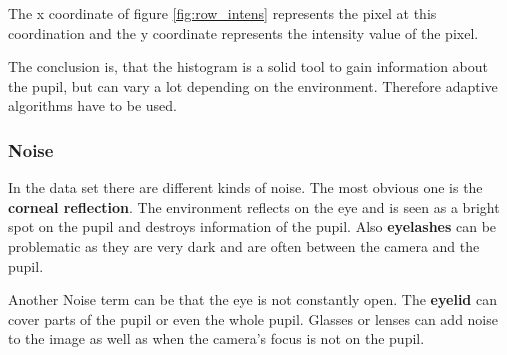     The x coordinate of figure \ref{fig:row_intens} represents the pixel at this coordination and the y coordinate represents the intensity value of the pixel. 

    The conclusion is, that the histogram is a solid tool to gain information about the pupil, but can vary a lot depending on the environment. Therefore adaptive algorithms have to be used. 
    
    \subsubsection{Noise}
      In the data set there are different kinds of noise. The most obvious one is the \textbf{corneal reflection}. The environment reflects on the eye and is seen as a bright spot on the pupil and destroys information of the pupil. Also \textbf{eyelashes} can be problematic as they are very dark and are often between the camera and the pupil. 

      Another Noise term can be that the eye is not constantly open. The \textbf{eyelid} can cover parts of the pupil or even the whole pupil. Glasses or lenses can add noise to the image as well as when the camera's focus is not on the pupil.